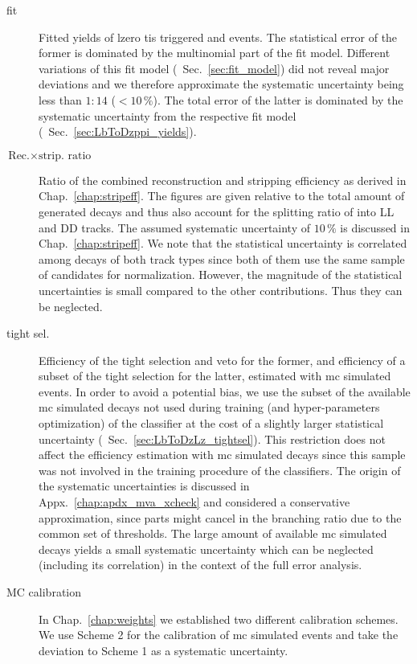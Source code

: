 \begin{description}
    \item[\decay{\Lb}{\Dz\Lz / \proton\pim} fit] Fitted yields of \gls{lzero} \gls{tis} triggered \decay{\Lb}{\Dz\Lz} and \decay{\Lb}{\Dz\proton\pim} events. The statistical error of the former is dominated by the multinomial part of the fit model. Different variations of this fit model (\cf{}~Sec.~\ref{sec:fit_model}) did not reveal major deviations and we therefore approximate the systematic uncertainty being less than $1:14$ ($<10\,\%$). The total error of the latter is dominated by the systematic uncertainty from the respective fit model (\cf{}~Sec.~\ref{sec:LbToDzppi_yields}).
    \item[$\text{Rec.} \times \text{strip. ratio}$] Ratio of the combined reconstruction and stripping efficiency as derived in Chap.~\ref{chap:stripeff}. The figures are given relative to the total amount of generated \decay{\Lb}{\Dz\Lz} decays and thus also account for the splitting ratio of \decay{\Lz}{\proton\pim} into \gls{LL} and \gls{DD} tracks. The assumed systematic uncertainty of $10\,\%$ is discussed in Chap.~\ref{chap:stripeff}. We note that the statistical uncertainty is correlated among \decay{\Lb}{\Dz\Lz} decays of both track types since both of them use the same sample of \decay{\Lb}{\Dz\proton\pim} candidates for normalization. However, the magnitude of the statistical uncertainties is small compared to the other contributions. Thus they can be neglected.
    \item[\decay{\Lb}{\Dz\Lz / \proton\pim} tight sel.] Efficiency of the tight selection and \decay{\Lb}{\Dz\proton\pim} veto for the former, and efficiency of a subset of the tight selection for the latter, estimated with \gls{mc} simulated events. In order to avoid a potential bias, we use the subset of the available \gls{mc} simulated \decay{\Lb}{\Dz\Lz} decays not used during training (and hyper-parameters optimization) of the classifier at the cost of a slightly larger statistical uncertainty (\cf{}~Sec.~\ref{sec:LbToDzLz_tightsel}). This restriction does not affect the efficiency estimation with \gls{mc} simulated \decay{\Lb}{\Dz\proton\pim} decays since this sample was not involved in the training procedure of the classifiers. The origin of the systematic uncertainties is discussed in Appx.~\ref{chap:apdx_mva_xcheck} and considered a conservative approximation, since parts might cancel in the branching ratio due to the common set of thresholds. The large amount of available \gls{mc} simulated \decay{\Lb}{\Dz\proton\pim} decays yields a small systematic uncertainty which can be neglected (including its correlation) in the context of the full error analysis.
    \item[MC calibration] In Chap.~\ref{chap:weights} we established two different calibration schemes. We use Scheme 2 for the calibration of \gls{mc} simulated events and take the deviation to Scheme 1 as a systematic uncertainty.
\end{description}

